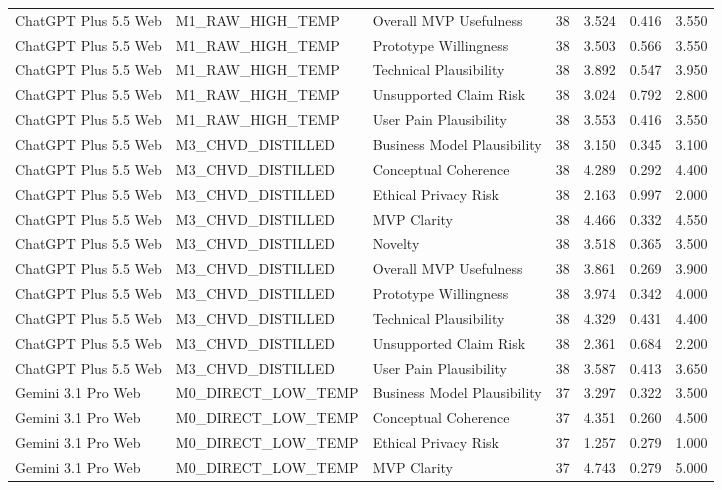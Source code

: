 \documentclass[10pt]{article}
\begin{document}
\begin{landscape}
\begin{longtable}{lllrrrr}
ChatGPT Plus 5.5 Web & M1\_RAW\_HIGH\_TEMP & Overall MVP Usefulness & 38 & 3.524 & 0.416 & 3.550 \\
ChatGPT Plus 5.5 Web & M1\_RAW\_HIGH\_TEMP & Prototype Willingness & 38 & 3.503 & 0.566 & 3.550 \\
ChatGPT Plus 5.5 Web & M1\_RAW\_HIGH\_TEMP & Technical Plausibility & 38 & 3.892 & 0.547 & 3.950 \\
ChatGPT Plus 5.5 Web & M1\_RAW\_HIGH\_TEMP & Unsupported Claim Risk & 38 & 3.024 & 0.792 & 2.800 \\
ChatGPT Plus 5.5 Web & M1\_RAW\_HIGH\_TEMP & User Pain Plausibility & 38 & 3.553 & 0.416 & 3.550 \\
ChatGPT Plus 5.5 Web & M3\_CHVD\_DISTILLED & Business Model Plausibility & 38 & 3.150 & 0.345 & 3.100 \\
ChatGPT Plus 5.5 Web & M3\_CHVD\_DISTILLED & Conceptual Coherence & 38 & 4.289 & 0.292 & 4.400 \\
ChatGPT Plus 5.5 Web & M3\_CHVD\_DISTILLED & Ethical Privacy Risk & 38 & 2.163 & 0.997 & 2.000 \\
ChatGPT Plus 5.5 Web & M3\_CHVD\_DISTILLED & MVP Clarity & 38 & 4.466 & 0.332 & 4.550 \\
ChatGPT Plus 5.5 Web & M3\_CHVD\_DISTILLED & Novelty & 38 & 3.518 & 0.365 & 3.500 \\
ChatGPT Plus 5.5 Web & M3\_CHVD\_DISTILLED & Overall MVP Usefulness & 38 & 3.861 & 0.269 & 3.900 \\
ChatGPT Plus 5.5 Web & M3\_CHVD\_DISTILLED & Prototype Willingness & 38 & 3.974 & 0.342 & 4.000 \\
ChatGPT Plus 5.5 Web & M3\_CHVD\_DISTILLED & Technical Plausibility & 38 & 4.329 & 0.431 & 4.400 \\
ChatGPT Plus 5.5 Web & M3\_CHVD\_DISTILLED & Unsupported Claim Risk & 38 & 2.361 & 0.684 & 2.200 \\
ChatGPT Plus 5.5 Web & M3\_CHVD\_DISTILLED & User Pain Plausibility & 38 & 3.587 & 0.413 & 3.650 \\
Gemini 3.1 Pro Web & M0\_DIRECT\_LOW\_TEMP & Business Model Plausibility & 37 & 3.297 & 0.322 & 3.500 \\
Gemini 3.1 Pro Web & M0\_DIRECT\_LOW\_TEMP & Conceptual Coherence & 37 & 4.351 & 0.260 & 4.500 \\
Gemini 3.1 Pro Web & M0\_DIRECT\_LOW\_TEMP & Ethical Privacy Risk & 37 & 1.257 & 0.279 & 1.000 \\
Gemini 3.1 Pro Web & M0\_DIRECT\_LOW\_TEMP & MVP Clarity & 37 & 4.743 & 0.279 & 5.000 \\

\end{longtable}
\end{landscape}
\end{document}
